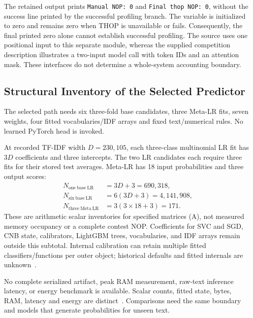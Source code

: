 \documentclass[doublecolumn]{ijcvsplatex}
\begin{document}
The retained output prints \texttt{Manual NOP: 0} and \texttt{Final thop NOP: 0}, without the success line printed by the successful profiling branch. The variable is initialized to zero and remains zero when THOP is unavailable or fails. Consequently, the final printed zero alone cannot establish successful profiling. The source uses one positional input to this separate module, whereas the supplied competition description illustrates a two-input model call with token IDs and an attention mask. These interfaces do not determine a whole-system accounting boundary.

\subsection{Structural Inventory of the Selected Predictor}
The selected path needs six three-fold base candidates, three Meta-LR fits, seven weights, four fitted vocabularies/IDF arrays and fixed text/numerical rules. No learned PyTorch head is invoked.

At recorded TF-IDF width $D=230{,}105$, each three-class multinomial LR fit has $3D$ coefficients and three intercepts. The two LR candidates each require three fits for their stored test averages. Meta-LR has 18 input probabilities and three output scores:
\begin{equation}
\begin{aligned}
N_{\mathrm{one\ base\ LR}}&=3D+3=690{,}318,\\
N_{\mathrm{six\ base\ LR}}&=6(3D+3)=4{,}141{,}908,\\
N_{\mathrm{three\ Meta\ LR}}&=3(3\times18+3)=171.
\end{aligned}
\label{eq:counts}
\end{equation}
These are arithmetic scalar inventories for specified matrices (A), not measured memory occupancy or a complete contest NOP. Coefficients for SVC and SGD, CNB state, calibrators, LightGBM trees, vocabularies, and IDF arrays remain outside this subtotal. Internal calibration can retain multiple fitted classifiers/functions per outer object; historical defaults and fitted internals are unknown~\cite{pedregosa2011scikit}.

No complete serialized artifact, peak RAM measurement, raw-text inference latency, or energy benchmark is available. Scalar counts, fitted state, bytes, RAM, latency and energy are distinct~\cite{henderson2020systematic}. Comparisons need the same boundary and models that generate probabilities for unseen text.
\end{document}
